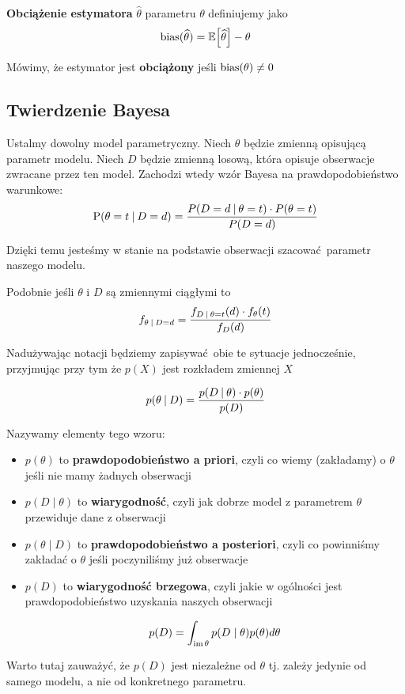 \begin{definition}
	\textbf{Obciążenie estymatora} \( \widehat \theta \) parametru \( \theta \) definiujemy jako
	\[
		\bias(\widehat \theta) = \expected{\widehat \theta} - \theta
	\]

	Mówimy, że estymator jest \textbf{obciążony} jeśli \( \operatorname{bias}(\theta) \neq 0 \)
\end{definition}

\subsection{Twierdzenie Bayesa}

Ustalmy dowolny model parametryczny.
Niech \( \theta \) będzie zmienną opisującą parametr modelu.
Niech \( D \) będzie zmienną losową, która opisuje obserwacje zwracane przez ten model.
Zachodzi wtedy wzór Bayesa na prawdopodobieństwo warunkowe:
\[
	\operatorname{P}(\theta = t \:\vert\: D = d) = \frac{P(D = d \:\vert\: \theta = t) \cdot P(\theta =t )}{P(D = d)}
\]

Dzięki temu jesteśmy w stanie na podstawie obserwacji szacować parametr naszego modelu.

Podobnie jeśli \( \theta \) i \( D \) są zmiennymi ciągłymi to
\[
	f_{\theta \:\vert\: D = d} = \frac{f_{D \:\vert\: \theta = t}(d) \cdot f_\theta(t)}{f_D(d)}
\]

Nadużywając notacji będziemy zapisywać obie te sytuacje jednocześnie, przyjmując przy tym że \( p(X) \) jest rozkładem zmiennej \( X \)

\[
	p(\theta \:\vert\: D) = \frac{p(D \:\vert\: \theta) \cdot p(\theta)}{p(D)}
\]

Nazywamy elementy tego wzoru:
\begin{itemize}
	\item \( p(\theta) \) to \textbf{prawdopodobieństwo a priori}, czyli co wiemy (zakładamy) o \( \theta \) jeśli nie mamy żadnych obserwacji
	\item \( p(D \mid \theta) \) to \textbf{wiarygodność}, czyli jak dobrze model z parametrem \( \theta \) przewiduje dane z obserwacji
	\item \( p(\theta \mid D) \) to \textbf{prawdopodobieństwo a posteriori}, czyli co powinniśmy zakładać o \( \theta \) jeśli poczyniliśmy już obserwacje
	\item \( p(D) \) to \textbf{wiarygodność brzegowa}, czyli jakie w ogólności jest prawdopodobieństwo uzyskania naszych obserwacji

	      \[
		      p(D) = \int_{\operatorname{im} \theta} p(D \mid \theta)p(\theta)d\theta
	      \]
\end{itemize}

Warto tutaj zauważyć, że \( p(D) \) jest niezależne od \( \theta \) tj. zależy jedynie od samego modelu, a nie od konkretnego parametru.

